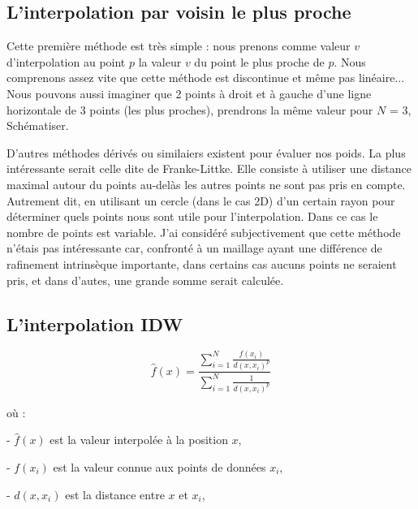 
\subsection{L'interpolation par voisin le plus proche}
Cette première méthode est très simple : nous prenons comme valeur \( v \) d'interpolation au point \( p \) la valeur \( v \) du point le plus proche de \( p \).
Nous comprenons assez vite que cette méthode est discontinue et même pas linéaire...
Nous pouvons aussi imaginer que 2 points à droit et à gauche d'une ligne horizontale de 3 points (les plus proches), prendrons la même valeur pour \( N \) = 3, Schématiser. 

D'autres méthodes dérivés ou similaiers existent pour évaluer nos poids. La plus intéressante serait celle dite de Franke-Littke. Elle consiste à utiliser une distance maximal autour du points au-delàs les autres points ne sont pas pris en compte. Autrement dit, en utilisant un cercle (dans le cas 2D) d'un certain rayon pour déterminer quels points nous sont utile pour l'interpolation. Dans ce cas le nombre de points est variable.
J'ai considéré subjectivement que cette méthode n'étais pas intéressante car, confronté à un maillage ayant une différence de rafinement intrinsèque importante, dans certains cas aucuns points ne seraient pris, et dans d'autes, une grande somme serait calculée.

\subsection{L'interpolation IDW}
\[
\hat{f}(x) = \frac{\sum_{i=1}^{N} \frac{f(x_i)}{d(x, x_i)^p}}{\sum_{i=1}^{N} \frac{1}{d(x, x_i)^p}}
\]

où :

- \(\hat{f}(x)\) est la valeur interpolée à la position \(x\),

- \(f(x_i)\) est la valeur connue aux points de données \(x_i\),

- \(d(x, x_i)\) est la distance entre \(x\) et \(x_i\),


